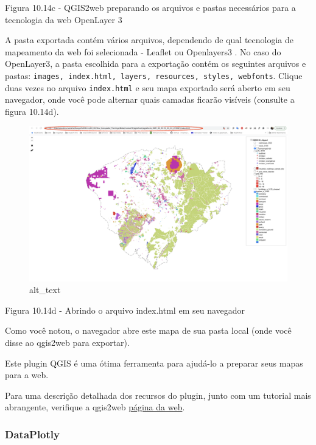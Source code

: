 \documentclass[
]{book}
\begin{document}
Figura 10.14c - QGIS2web preparando os arquivos e pastas necessários para a tecnologia da web OpenLayer 3

A pasta exportada contém vários arquivos, dependendo de qual tecnologia de mapeamento da web foi selecionada - Leaflet ou Openlayers3 . No caso do OpenLayer3, a pasta escolhida para a exportação contém os seguintes arquivos e pastas: \texttt{images,\ index.html,\ layers,\ resources,\ styles,\ webfonts}. Clique duas vezes no arquivo \texttt{index.html} e seu mapa exportado será aberto em seu navegador, onde você pode alternar quais camadas ficarão visíveis (consulte a figura 10.14d).

\begin{figure}
\centering
\includegraphics{media/modulo10/fig1014_d.png}
\caption{alt\_text}
\end{figure}

Figura 10.14d - Abrindo o arquivo index.html em seu navegador

Como você notou, o navegador abre este mapa de sua pasta local (onde você disse ao qgis2web para exportar).

Este plugin QGIS é uma ótima ferramenta para ajudá-lo a preparar seus mapas para a web.

Para uma descrição detalhada dos recursos do plugin, junto com um tutorial mais abrangente, verifique a qgis2web \href{https://github.com/tomchadwin/qgis2web}{página da web}.

\hypertarget{dataplotly}{%
\subsubsection{\texorpdfstring{\textbf{DataPlotly}}{DataPlotly}}\label{dataplotly}}
\end{document}
